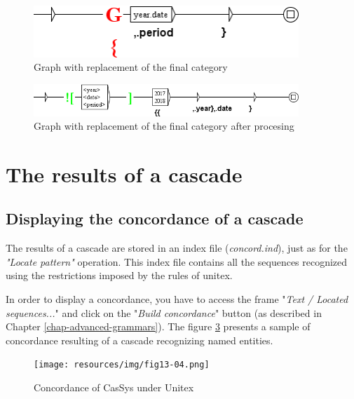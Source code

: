 \begin{figure}[!htb]
  \centering
  \includegraphics[width=10cm]{resources/img/graphe_remplacement.png}
  \caption{Graph with replacement of the final category}
  \label{fig:graphe_remplacement}
\end{figure}

\begin{figure}[!htb]
  \centering
  \includegraphics[width=10cm]{resources/img/graphe_remplacement_genere.png}
  \caption{Graph with replacement of the final category after procesing}
  \label{fig:graphe_remplacement_genere}
\end{figure}

\section{The results of a cascade}

\subsection{Displaying the concordance of a cascade}
\label{subsec:resultsCascade}

The results of a cascade are stored in an index file (\textit{concord.ind}), just as for the \textit{"Locate pattern"} operation. This index file contains all the sequences recognized using the restrictions imposed by the rules of unitex.

\bigskip
\noindent In order to display a concordance, you have to access the frame "\textit{Text / Located sequences...}" and click on the "\textit{Build concordance}" button (as described in Chapter \ref{chap-advanced-grammars}).
The figure \ref{fig13-04} presents a sample of concordance resulting of a cascade recognizing named entities. 
\begin{figure}[!htb]
  \centering
  \texttt{[image: resources/img/fig13-04.png]}
  \caption{Concordance of CasSys under Unitex}
  \label{fig13-04}
\end{figure}

